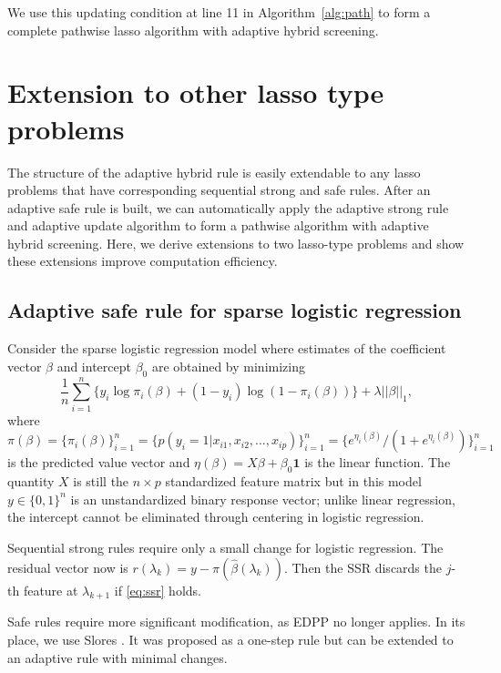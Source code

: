 We use this updating condition at line 11 in Algorithm~\ref{alg:path} to form a complete pathwise lasso algorithm with adaptive hybrid screening. 

\section{Extension to other lasso type problems}
\label{sec:4}

The structure of the adaptive hybrid rule is easily extendable to any lasso problems that have corresponding sequential strong and safe rules. After an adaptive safe rule is built, we can automatically apply the adaptive strong rule and adaptive update algorithm to form a pathwise algorithm with adaptive hybrid screening. Here, we derive extensions to two lasso-type problems and show these extensions improve computation efficiency.

\subsection{Adaptive safe rule for sparse logistic regression}

Consider the sparse logistic regression model where estimates of the coefficient vector $\beta$ and intercept $\beta_0$ are obtained by minimizing
\begin{equation}
    \label{eq:logis}
  \frac{1}{n} \sum_{i=1}^n \big\{y_i\log\pi_i(\beta) + (1-y_i)\log(1 -\pi_i(\beta))\big\} + \lambda||\beta||_1,
\end{equation}
where $\pi(\beta)=\{\pi_i(\beta)\}_{i=1}^n=\{p(y_i=1|x_{i1},x_{i2},...,x_{ip})\}_{i=1}^n=\{e^{\eta_i(\beta)}/(1+e^{\eta_i(\beta)})\}_{i=1}^n$ is the predicted value vector and $\eta(\beta)=X\beta+\beta_0\mathbf{1}$ is the linear function. The quantity $X$ is still the $n\times p$ standardized feature matrix but in this model $y\in\{0,1\}^n$ is an unstandardized binary response vector; unlike linear regression, the intercept cannot be eliminated through centering in logistic regression.

Sequential strong rules require only a small change for logistic regression. The residual vector now is $r(\lambda_k)=y-\pi(\hat{\beta}(\lambda_k))$. Then the SSR discards the $j$-th feature at $\lambda_{k+1}$ if \eqref{eq:ssr} holds.

Safe rules require more significant modification, as EDPP no longer applies. In its place, we use Slores \citep[sparse logistic regression screening rule,][]{wang2014safe}. It was proposed as a one-step rule but can be extended to an adaptive rule with minimal changes. 

